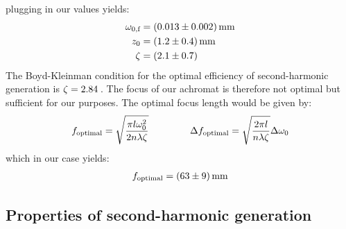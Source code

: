 \documentclass{protokoll_en}
\begin{document}
plugging in our values yields:
\begin{align}
\omega_{0,\textrm{f}} &= \unit[(0.013 \pm 0.002)]{mm} \\
\notag z_0 &= \unit[(1.2 \pm 0.4)]{mm}\\
\notag \zeta &= \unit[(2.1 \pm 0.7)]{}
\end{align}
The Boyd-Kleinman condition for the optimal efficiency of second-harmonic generation is $\zeta = \unit[2.84]{}$. The focus of our achromat is therefore not optimal but sufficient for our purposes. The optimal focus length would be given by:
\begin{align}
f_\textrm{optimal} = \sqrt{\frac{\pi l \omega^2_0}{2n\lambda\zeta}} \hspace{1.5cm} \Delta f_\textrm{optimal} = \sqrt{\frac{2\pi l}{n\lambda\zeta}}\Delta\omega_0
\end{align}
which in our case yields:
\begin{align}
f_\textrm{optimal} = \unit[(63 \pm 9)]{mm}
\end{align}
\subsection{Properties of second-harmonic generation}\label{subsec:ana_props_2ndharmonic}
\end{document}
